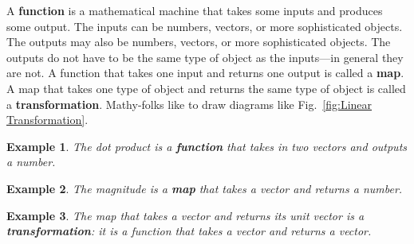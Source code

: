 \documentclass[12pt]{article}
\newtheorem{example}{Example}[section]
\begin{document}
A \textbf{function} is a mathematical machine that takes some inputs and produces some output. The inputs can be numbers, vectors, or more sophisticated objects. The outputs may also be numbers, vectors, or more sophisticated objects. The outputs do not have to be the same type of object as the inputs---in general they are not.
% 
A function that takes one input and returns one output is called a \textbf{map}. 
% 
A map that takes one type of object and returns the same type of object is called a \textbf{transformation}. Mathy-folks like to draw diagrams like Fig.~\ref{fig:Linear Transformation}.

\begin{example}
The dot product is a \textbf{function} that takes in two vectors and outputs a number.
\end{example}
\begin{example}
The magnitude is a \textbf{map} that takes a vector and returns a number.
\end{example}
\begin{example}
The map that takes a vector and returns its unit vector is a \textbf{transformation}: it is a function that takes a vector and returns a vector.
\end{example}
\end{document}
